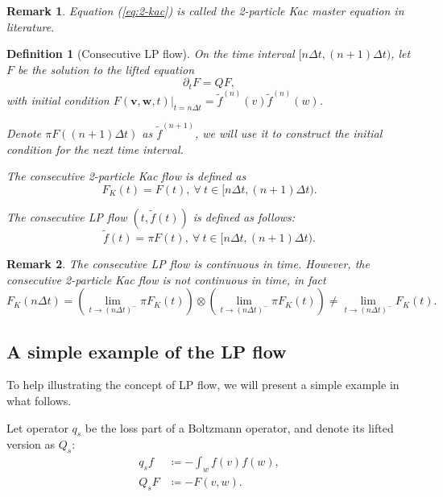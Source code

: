 \documentclass{article}
\newtheorem{defi}{Definition}
\newtheorem{remark}{Remark}
\numberwithin{equation}{section}
\begin{document}
\begin{remark}
    Equation (\ref{eq:2-kac}) is called the 2-particle Kac master equation in literature.
\end{remark}

\begin{defi}[Consecutive LP flow]
    On the time interval $[n\Delta t, (n+1)\Delta t)$, let $F$ be the solution to the lifted equation 
    \begin{equation*}
    \partial_{t} F = Q F,
    \end{equation*}
    with initial condition $\left.F(\mathbf{v},\mathbf{w},t)\right|_{t=n\Delta t} =\widetilde{f}^{(n)}(v)\widetilde{f}^{(n)}(w)$. 
    
    Denote $\pi F((n+1)\Delta t)$ as $\widetilde{f}^{(n+1)}$, we will use it to construct the initial condition for the next time interval.

    The consecutive 2-particle Kac flow is defined as
    \begin{equation*}
        F_{K}(t) = F(t), \ \forall\ t\in[n\Delta t, (n+1) \Delta t).
    \end{equation*}
    
    The consecutive LP flow $(t,\widetilde{f}(t))$ is defined as follows:
    \begin{equation}
        \widetilde{f}(t) = \pi F(t), \ \forall\ t\in[n\Delta t, (n+1) \Delta t).
    \end{equation}
\end{defi}

\begin{remark}
    The consecutive LP flow is continuous in time. However, the consecutive 2-particle Kac flow is not continuous in time, in fact
    \begin{equation}
        F_{K}(n\Delta t) = \left( \lim_{t\rightarrow (n\Delta t)^{-}}\pi F_{K}(t)\right) \otimes \left( \lim_{t\rightarrow (n\Delta t)^{-}}\pi F_{K}(t)\right) \neq \lim_{t\rightarrow (n\Delta t)^{-}} F_{K}(t).
    \end{equation}
\end{remark}




\subsection{A simple example of the LP flow}
To help illustrating the concept of LP flow, we will present a simple example in what follows.

Let operator $q_{s}$ be the loss part of a Boltzmann operator, and denote its lifted version as $Q_{s}$:
\begin{equation}\label{eq:q_loss}
    \begin{split}
        q_{s} f &\coloneqq - \int_{w} f(v) f(w),\\
        Q_{s} F &\coloneqq - F(v ,w).
    \end{split}
\end{equation}
\end{document}
